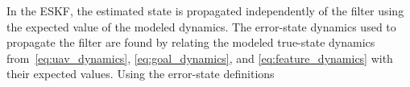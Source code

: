 In the ESKF, the estimated state is propagated independently of the filter using
the expected value of the modeled dynamics.
The error-state dynamics used to propagate the filter are found by relating
the modeled true-state dynamics from~\eqref{eq:uav_dynamics},
\eqref{eq:goal_dynamics}, and \eqref{eq:feature_dynamics}
with their expected values. Using the error-state definitions
